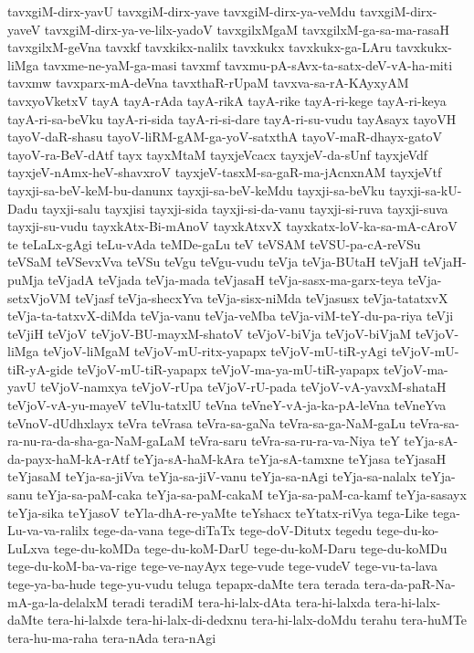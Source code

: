 {tavxgiM-dirx-yavU
tavxgiM-dirx-yave
tavxgiM-dirx-ya-veMdu
tavxgiM-dirx-yaveV
tavxgiM-dirx-ya-ve-lilx-yadoV
tavxgilxMgaM
tavxgilxM-ga-sa-ma-rasaH
tavxgilxM-geVna
tavxkf
tavxkikx-nalilx
tavxkukx
tavxkukx-ga-LAru
tavxkukx-liMga
tavxme-ne-yaM-ga-masi
tavxmf
tavxmu-pA-sAvx-ta-satx-deV-vA-ha-miti
tavxmw
tavxparx-mA-deVna
tavxthaR-rUpaM
tavxva-sa-rA-KAyxyAM
tavxyoVketxV
tayA
tayA-rAda
tayA-rikA
tayA-rike
tayA-ri-kege
tayA-ri-keya
tayA-ri-sa-beVku
tayA-ri-sida
tayA-ri-si-dare
tayA-ri-su-vudu
tayAsayx
tayoVH
tayoV-daR-shasu
tayoV-liRM-gAM-ga-yoV-satxthA
tayoV-maR-dhayx-gatoV
tayoV-ra-BeV-dAtf
tayx
tayxMtaM
tayxjeVcacx
tayxjeV-da-sUnf
tayxjeVdf
tayxjeV-nAmx-heV-shavxroV
tayxjeV-tasxM-sa-gaR-ma-jAcnxnAM
tayxjeVtf
tayxji-sa-beV-keM-bu-danunx
tayxji-sa-beV-keMdu
tayxji-sa-beVku
tayxji-sa-kU-Dadu
tayxji-salu
tayxjisi
tayxji-sida
tayxji-si-da-vanu
tayxji-si-ruva
tayxji-suva
tayxji-su-vudu
tayxkAtx-Bi-mAnoV
tayxkAtxvX
tayxkatx-loV-ka-sa-mA-cAroV
te
teLaLx-gAgi
teLu-vAda
teMDe-gaLu
teV
teVSAM
teVSU-pa-cA-reVSu
teVSaM
teVSevxVva
teVSu
teVgu
teVgu-vudu
teVja
teVja-BUtaH
teVjaH
teVjaH-puMja
teVjadA
teVjada
teVja-mada
teVjasaH
teVja-sasx-ma-garx-teya
teVja-setxVjoVM
teVjasf
teVja-shecxYva
teVja-sisx-niMda
teVjasusx
teVja-tatatxvX
teVja-ta-tatxvX-diMda
teVja-vanu
teVja-veMba
teVja-viM-teY-du-pa-riya
teVji
teVjiH
teVjoV
teVjoV-BU-mayxM-shatoV
teVjoV-biVja
teVjoV-biVjaM
teVjoV-liMga
teVjoV-liMgaM
teVjoV-mU-ritx-yapapx
teVjoV-mU-tiR-yAgi
teVjoV-mU-tiR-yA-gide
teVjoV-mU-tiR-yapapx
teVjoV-ma-ya-mU-tiR-yapapx
teVjoV-ma-yavU
teVjoV-namxya
teVjoV-rUpa
teVjoV-rU-pada
teVjoV-vA-yavxM-shataH
teVjoV-vA-yu-mayeV
teVlu-tatxlU
teVna
teVneY-vA-ja-ka-pA-leVna
teVneYva
teVnoV-dUdhxlayx
teVra
teVrasa
teVra-sa-gaNa
teVra-sa-ga-NaM-gaLu
teVra-sa-ra-nu-ra-da-sha-ga-NaM-gaLaM
teVra-saru
teVra-sa-ru-ra-va-Niya
teY
teYja-sA-da-payx-haM-kA-rAtf
teYja-sA-haM-kAra
teYja-sA-tamxne
teYjasa
teYjasaH
teYjasaM
teYja-sa-jiVva
teYja-sa-jiV-vanu
teYja-sa-nAgi
teYja-sa-nalalx
teYja-sanu
teYja-sa-paM-caka
teYja-sa-paM-cakaM
teYja-sa-paM-ca-kamf
teYja-sasayx
teYja-sika
teYjasoV
teYla-dhA-re-yaMte
teYshacx
teYtatx-riVya
tega-Like
tega-Lu-va-va-ralilx
tege-da-vana
tege-diTaTx
tege-doV-Ditutx
tegedu
tege-du-ko-LuLxva
tege-du-koMDa
tege-du-koM-DarU
tege-du-koM-Daru
tege-du-koMDu
tege-du-koM-ba-va-rige
tege-ve-nayAyx
tege-vude
tege-vudeV
tege-vu-ta-lava
tege-ya-ba-hude
tege-yu-vudu
teluga
tepapx-daMte
tera
terada
tera-da-paR-Na-mA-ga-la-delalxM
teradi
teradiM
tera-hi-lalx-dAta
tera-hi-lalxda
tera-hi-lalx-daMte
tera-hi-lalxde
tera-hi-lalx-di-dedxnu
tera-hi-lalx-doMdu
terahu
tera-huMTe
tera-hu-ma-raha
tera-nAda
tera-nAgi
}
